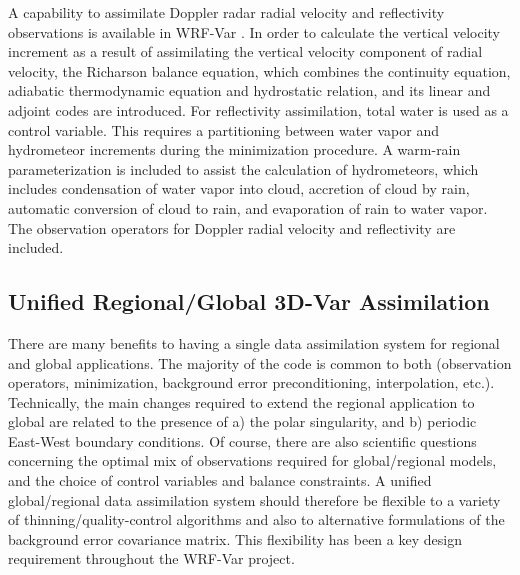 A capability to assimilate Doppler radar radial velocity
and reflectivity observations is available in WRF-Var
\citep{xiao05, xiao07, xiao072, xiao08}.
In order to calculate the vertical velocity increment as a result of
assimilating the vertical velocity component of radial velocity,
the Richarson balance equation, which combines the continuity
equation, adiabatic thermodynamic equation and hydrostatic
relation, and its linear and adjoint codes are introduced.
For reflectivity assimilation, total water is used as a control variable. 
This requires a partitioning
between water vapor and hydrometeor increments during the minimization procedure.
A warm-rain parameterization is included to assist the calculation
of hydrometeors, which includes condensation of water vapor
into cloud, accretion of cloud by rain, automatic
conversion of cloud to rain, and evaporation of rain to water vapor.
The observation operators for Doppler radial velocity
and reflectivity are included.

\subsection{Unified Regional/Global 3D-Var Assimilation}

There are many benefits to having a single data assimilation system
for regional and global applications. The majority of the code is
common to both (observation operators, minimization, background error
preconditioning, interpolation, etc.). Technically, the main changes
required to extend the regional application to global are related to
the presence of a) the polar singularity, and b) periodic East-West
boundary conditions. Of course, there are also scientific questions
concerning the optimal mix of observations required for
global/regional models, and the choice of control variables and
balance constraints. A unified global/regional data assimilation system should
therefore be flexible to a variety of thinning/quality-control
algorithms and also to alternative formulations of the background
error covariance matrix. This flexibility has been a key design
requirement throughout the WRF-Var project.

